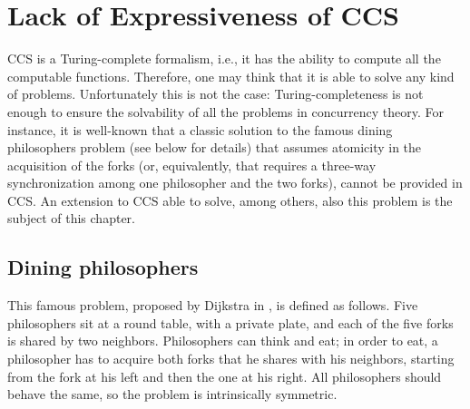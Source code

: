 % 
% 
% 


\section{Lack of Expressiveness of CCS}

  CCS is a Turing-complete formalism, i.e., it has the ability to compute all the computable functions. Therefore, one may think that it is able to solve any kind of problems. Unfortunately this is not the case: Turing-completeness is not enough to ensure the solvability of all the problems in concurrency theory. For instance, it is well-known that a classic solution to the famous dining philosophers problem \cite{Dij71} (see below for details)  that assumes atomicity in the acquisition of the forks (or, equivalently, that requires a three-way synchronization among one philosopher and the two forks), cannot be provided  in CCS. An extension to CCS able to solve, among others, also this problem is the subject of this chapter.


\subsection{Dining philosophers}
  This famous problem, proposed by Dijkstra in \cite{Dij71}, is defined as follows. Five philosophers sit at a round table, with a private plate, and each of the five forks is shared by two neighbors. Philosophers can think and eat; in order to eat, a philosopher has to acquire both forks that he shares with his neighbors, starting from the fork at his left and then the one at his right. All philosophers should behave the same, so the problem is intrinsically symmetric.

